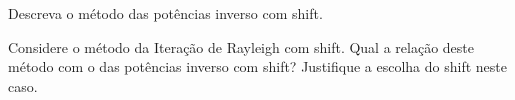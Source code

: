 \begin{questions}
    \question Descreva o m\'{e}todo das pot\^{e}ncias inverso com shift.
    \begin{solution}
    \end{solution}

    \question Considere o m\'{e}todo da Itera\c{c}\~{a}o de Rayleigh com shift. Qual a rela\c{c}\~{a}o deste m\'{e}todo com o das pot\^{e}ncias inverso com shift? Justifique a escolha do shift neste caso.
    \begin{solution}
    \end{solution}
\end{questions}
